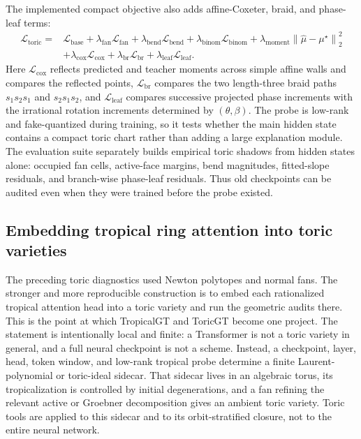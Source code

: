 \documentclass[11pt]{article}
\theoremstyle{definition}
\theoremstyle{plain}
\theoremstyle{remark}
\numberwithin{equation}{section}
\newcommand{\norm}[1]{\left\lVert #1\right\rVert}
\begin{document}
The implemented compact objective also adds affine-Coxeter, braid, and phase-leaf terms:
\begin{equation}
\begin{split}
  \mathcal L_{\mathrm{toric}}
  ={}&\mathcal L_{\mathrm{base}}
  +\lambda_{\mathrm{fan}}\mathcal L_{\mathrm{fan}}
  +\lambda_{\mathrm{bend}}\mathcal L_{\mathrm{bend}}
  +\lambda_{\mathrm{binom}}\mathcal L_{\mathrm{binom}}
  +\lambda_{\mathrm{moment}}\norm{\widehat\mu-\mu^\star}_2^2\\
  &+\lambda_{\mathrm{cox}}\mathcal L_{\mathrm{cox}}
  +\lambda_{\mathrm{br}}\mathcal L_{\mathrm{br}}
  +\lambda_{\mathrm{leaf}}\mathcal L_{\mathrm{leaf}}.
\end{split}
\end{equation}
Here $\mathcal L_{\mathrm{cox}}$ reflects predicted and teacher moments across simple affine walls and compares the reflected points, $\mathcal L_{\mathrm{br}}$ compares the two length-three braid paths $s_1s_2s_1$ and $s_2s_1s_2$, and $\mathcal L_{\mathrm{leaf}}$ compares successive projected phase increments with the irrational rotation increments determined by $(\theta,\beta)$.  The probe is low-rank and fake-quantized during training, so it tests whether the main hidden state contains a compact toric chart rather than adding a large explanation module.  The evaluation suite separately builds empirical toric shadows from hidden states alone: occupied fan cells, active-face margins, bend magnitudes, fitted-slope residuals, and branch-wise phase-leaf residuals.  Thus old checkpoints can be audited even when they were trained before the probe existed.

\subsection{Embedding tropical ring attention into toric varieties}\label{subsec:tropical-ring-attention-toric-embedding}

The preceding toric diagnostics used Newton polytopes and normal fans.  The stronger and more reproducible construction is to embed each rationalized tropical attention head into a toric variety and run the geometric audits there.  This is the point at which TropicalGT and ToricGT become one project.  The statement is intentionally local and finite: a Transformer is not a toric variety in general, and a full neural checkpoint is not a scheme.  Instead, a checkpoint, layer, head, token window, and low-rank tropical probe determine a finite Laurent-polynomial or toric-ideal sidecar.  That sidecar lives in an algebraic torus, its tropicalization is controlled by initial degenerations, and a fan refining the relevant active or Groebner decomposition gives an ambient toric variety.  Toric tools are applied to this sidecar and to its orbit-stratified closure, not to the entire neural network.
\end{document}
